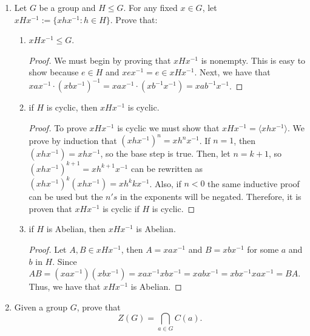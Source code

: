 \documentclass[a4paper]{article}
\begin{document}
\begin{enumerate}[leftmargin=*, label=(\textbf{\arabic*})]
\begin{proof}
Therefore, we have proven that \[ H:= \left\{ \begin{bmatrix} 1 & n \\ 0 & 1 \end{bmatrix} : n \in \mathbb{Z} \right\} \] 
is a cyclic subgroup of $GL_2 (\mathbb{R})$.
\end{proof}


\item Let $G$ be a group and $H \leq G$. For any fixed $x \in G$, let $xHx^{-1} := \{ xhx^{-1} : h \in H \}$. Prove that:
\begin{enumerate}[leftmargin=*, label=(\textbf{\alph*})]
\item  $xHx^{-1} \leq G$.


\begin{proof}

We must begin by proving that $xHx^{-1}$ is nonempty.  This is easy to show because $e \in H$ and $xex^{-1}=e \in xHx^{-1}$.  Next, we have that $xax^{-1} \cdot (xbx^{-1})^{-1}=xax^{-1} \cdot (xb^{-1}x^{-1}) = xab^{-1}x^{-1}$.  
\end{proof}


\item  if $H$ is cyclic, then $xHx^{-1}$ is cyclic. 

\begin{proof}
To prove $xHx^{-1}$ is cyclic we must show that $xHx^{-1} = \langle xhx^{-1} \rangle$.  We prove by induction that $(xhx^{-1})^{n}=xh^{n}x^{-1}$.  If $n=1$, then $(xhx^{-1})=xhx^{-1}$, so the base step is true.  Then, let $n=k+1$, so $(xhx^{-1})^{k+1}=xh^{k+1}x^{-1}$ can be rewritten as $(xhx^{-1})^{k}(xhx^{-1}) = xh^{k}kx^{-1}$.  Also, if $n<0$ the same inductive proof can be used but the $n's$ in the exponents will be negated.  Therefore, it is proven that $xHx^{-1}$ is cyclic if $H$ is cyclic.  
\end{proof}

\item  if $H$ is Abelian, then $xHx^{-1}$ is Abelian.

\begin{proof}
Let $A,B \in xHx^{-1}$, then $A = xax^{-1}$ and $B = xbx^{-1}$ for some $a$ and $b$ in $H$.  Since $AB = (xax^{-1})(xbx^{-1}) = xax^{-1}xbx^{-1} = xabx^{-1} = xbx^{-1}xax^{-1} = BA$.  Thus, we have that $xHx^{-1}$ is Abelian.  
\end{proof}

\end{enumerate} 

\item Given a group $G$, prove that 
\[ Z(G) = \bigcap_{a \in G} C(a). \]


\end{enumerate}
\end{document}
